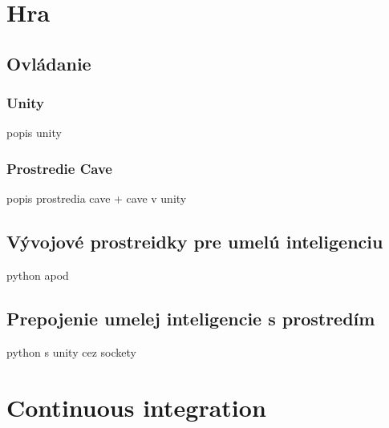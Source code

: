 \documentclass[12pt]{article}
\begin{document}
    
    
    
    
    \section{Hra}\label{sec:game}
    \subsection{Ovládanie}\label{subsec:controlling}
    \subsubsection{Unity}
    popis unity
    \subsubsection{Prostredie Cave}
    popis prostredia cave + cave v unity
    \subsection{Vývojové prostreidky pre umelú inteligenciu}\label{subsec:dev-tools-for-ai}
    python apod
    \subsection{Prepojenie umelej inteligencie s prostredím}\label{subsec:connection}
    python s unity cez sockety

    \section{Continuous integration}\label{sec:continuous-integration}
    
    
\end{document}

